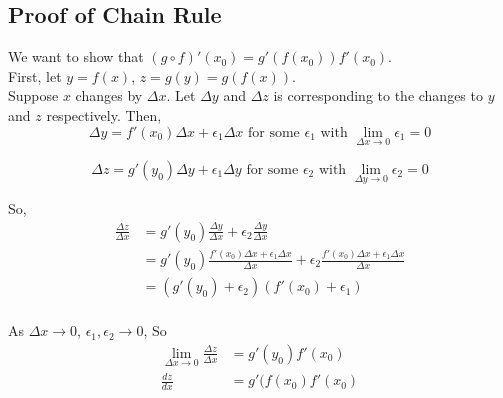 \documentclass[12pt]{article}
\begin{document}
\subsection{Proof of Chain Rule}
We want to show that $(g \circ f)'(x_0) = g'(f(x_0))f'(x_0)$.\\
First, let $y = f(x)$, $z = g(y) = g(f(x))$. \\ 

\noindent
Suppose $x$ changes by $\Delta x$. Let $\Delta y$ and $\Delta z$ is corresponding to the changes to $y$ and $z$ respectively.
Then, 
\[
    \Delta y = f'(x_0) \Delta x + \epsilon_1 \Delta x \textrm{ for some } \epsilon_1 \textrm{ with }\lim_{\Delta x \to 0} \epsilon_1 = 0
\]

\[
    \Delta z = g'(y_0) \Delta y + \epsilon_1 \Delta y \textrm{ for some } \epsilon_2 \textrm{ with }\lim_{\Delta y \to 0} \epsilon_2 = 0
\]

So,
\begin{align*} 
    \frac{\Delta z}{\Delta x}  &= g'(y_0) \frac{\Delta y}{\Delta x}  + \epsilon_2 \frac{\Delta y}{\Delta x} \\
    &= g'(y_0) \frac{f'(x_0) \Delta x + \epsilon_1 \Delta x}{\Delta x}  + \epsilon_2 \frac{f'(x_0) \Delta x + \epsilon_1 \Delta x}{\Delta x} \\
    &= (g'(y_0) + \epsilon_2)(f'(x_0) + \epsilon_1) \\
\end{align*}

As $\Delta x \to 0$, $\epsilon_1, \epsilon_2 \to 0$, So
\begin{align*} 
    \lim_{\Delta x \to 0}\frac{\Delta z}{\Delta x} &= g'(y_0)f'(x_0) \\
    \frac{dz}{dx} &= g'(f(x_0)f'(x_0) 
\end{align*}
\end{document}
